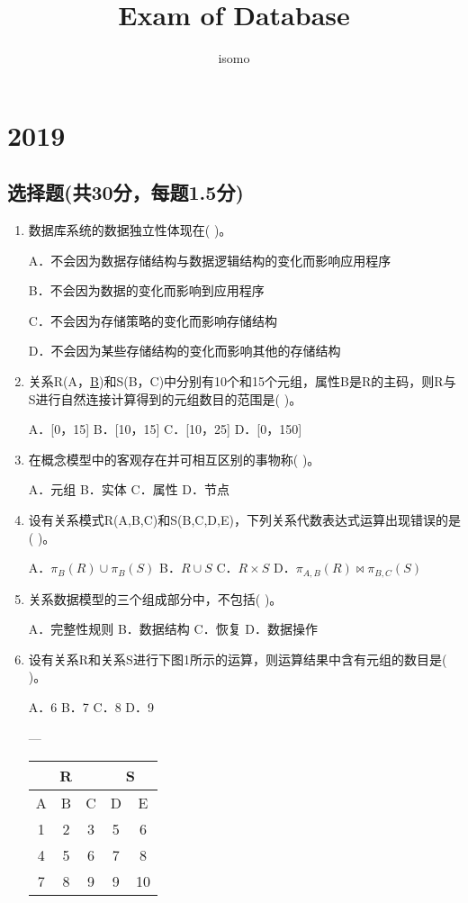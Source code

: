 \documentclass{article}
\title{Exam of Database}
\author{isomo}
\begin{document}
\maketitle

\section{2019}

\subsection{选择题(共30分，每题1.5分)}

\begin{enumerate}
\item 数据库系统的数据独立性体现在( )。

A．不会因为数据存储结构与数据逻辑结构的变化而影响应用程序

B．不会因为数据的变化而影响到应用程序

C．不会因为存储策略的变化而影响存储结构

D．不会因为某些存储结构的变化而影响其他的存储结构

\item 关系R(A，\underline{B})和S(B，C)中分别有10个和15个元组，属性B是R的主码，则R与S进行自然连接计算得到的元组数目的范围是( )。

A．[0，15] B．[10，15] C．[10，25] D．[0，150]

\item 在概念模型中的客观存在并可相互区别的事物称( )。

A．元组 B．实体 C．属性 D．节点

\item 设有关系模式R(A,B,C)和S(B,C,D,E)，下列关系代数表达式运算出现错误的是( )。

A．$\pi_B(R) \cup \pi_B(S)$ B．$R \cup S$ C．$R \times S$ D．$\pi_{A,B}(R) \Join \pi_{B,C}(S)$

\item 关系数据模型的三个组成部分中，不包括( )。

A．完整性规则     B．数据结构       C．恢复       D．数据操作

\item 设有关系R和关系S进行下图1所示的运算，则运算结果中含有元组的数目是( )。

A．6 B．7 C．8 D．9

---

\begin{tabular}{ccc|cc}
\multicolumn{3}{c|}{R} & \multicolumn{2}{c}{S} \\
\hline
A & B & C & D & E \\
\hline
1 & 2 & 3 & 5 & 6 \\
4 & 5 & 6 & 7 & 8 \\
7 & 8 & 9 & 9 & 10 \\
\end{tabular}


\end{enumerate}
\end{document}
